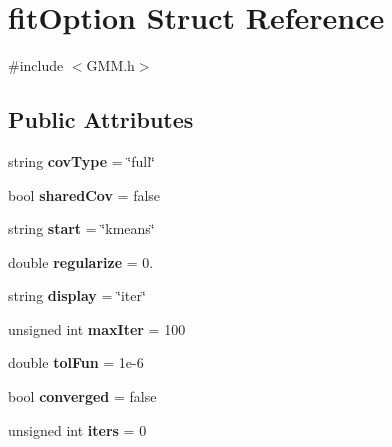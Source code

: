 \hypertarget{structfit_option}{\section{fit\+Option Struct Reference}
\label{structfit_option}
}


{\ttfamily \#include $<$G\+M\+M.\+h$>$}

\subsection*{Public Attributes}
\begin{DoxyCompactItemize}
\item 
\hypertarget{structfit_option_ae1d880f6fcd26e15f07d50c77c5cceea}{string {\bfseries cov\+Type} = \char`\"{}full\char`\"{}}\label{structfit_option_ae1d880f6fcd26e15f07d50c77c5cceea}

\item 
\hypertarget{structfit_option_a2efaf3629539e3864967853058e80420}{bool {\bfseries shared\+Cov} = false}\label{structfit_option_a2efaf3629539e3864967853058e80420}

\item 
\hypertarget{structfit_option_a4c1ecd5ba984e2e12faa29217c78f931}{string {\bfseries start} = \char`\"{}kmeans\char`\"{}}\label{structfit_option_a4c1ecd5ba984e2e12faa29217c78f931}

\item 
\hypertarget{structfit_option_abffa02537679becf07413b31f5889e6f}{double {\bfseries regularize} = 0.}\label{structfit_option_abffa02537679becf07413b31f5889e6f}

\item 
\hypertarget{structfit_option_acd949efbbb51ddf447d4cb86fd2ac901}{string {\bfseries display} = \char`\"{}iter\char`\"{}}\label{structfit_option_acd949efbbb51ddf447d4cb86fd2ac901}

\item 
\hypertarget{structfit_option_a54d1906ece53c348047c8b404ff06053}{unsigned int {\bfseries max\+Iter} = 100}\label{structfit_option_a54d1906ece53c348047c8b404ff06053}

\item 
\hypertarget{structfit_option_a4523efadc5bc4f29cd1648ac4ca018dd}{double {\bfseries tol\+Fun} = 1e-\/6}\label{structfit_option_a4523efadc5bc4f29cd1648ac4ca018dd}

\item 
\hypertarget{structfit_option_a600d82e88e845abb5a442f80eecf89cb}{bool {\bfseries converged} = false}\label{structfit_option_a600d82e88e845abb5a442f80eecf89cb}

\item 
\hypertarget{structfit_option_a711048d488fccee5740b31e4149c46de}{unsigned int {\bfseries iters} = 0}\label{structfit_option_a711048d488fccee5740b31e4149c46de}

\end{DoxyCompactItemize}



